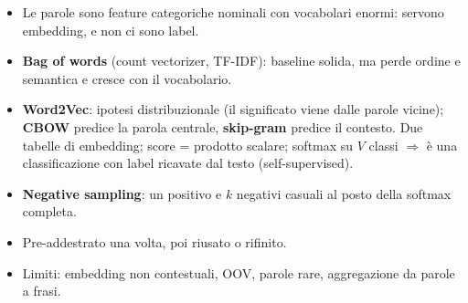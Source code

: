 \begin{sintesi}
\begin{itemize}
  \item Le parole sono feature categoriche nominali con vocabolari enormi: servono embedding, e non ci sono label.
  \item \textbf{Bag of words} (count vectorizer, TF-IDF): baseline solida, ma perde ordine e semantica e cresce con il vocabolario.
  \item \textbf{Word2Vec}: ipotesi distribuzionale (il significato viene dalle parole vicine); \textbf{CBOW} predice la parola
        centrale, \textbf{skip-gram} predice il contesto. Due tabelle di embedding; score = prodotto scalare; softmax su $V$ classi
        $\Rightarrow$ è una classificazione con label ricavate dal testo (self-supervised).
  \item \textbf{Negative sampling}: un positivo e $k$ negativi casuali al posto della softmax completa.
  \item Pre-addestrato una volta, poi riusato o rifinito.
  \item Limiti: embedding non contestuali, OOV, parole rare, aggregazione da parole a frasi.
\end{itemize}
\end{sintesi}
